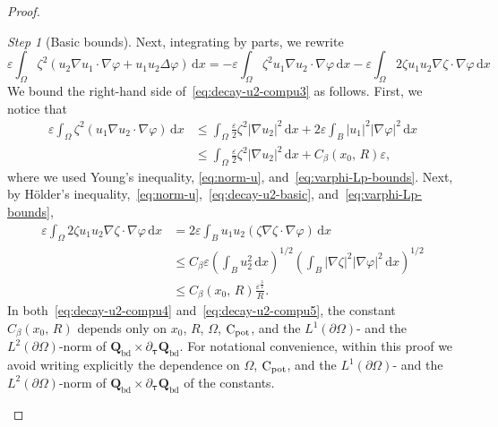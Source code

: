 \documentclass[a4paper, 11pt, twoside, leqno]{article}
\theoremstyle{definition}              %
\theoremstyle{remark}                  %
\newtheorem{step}{Step}
\newcommand{\abs}[1]{\left| #1 \right|}                             %
\renewcommand{\d}{\mathrm{d}}
\newcommand{\Q}{\mathbf{Q}}
\newcommand{\eps}{\varepsilon}
\newcommand{\Cpot}{{\rm C}_{\rm pot}}
\newcommand{\ttau}{{\boldsymbol{\tau}}}
\newcommand{\Qb}{\Q_{\mathrm{bd}}}
\begin{document}
\begin{proof}
\begin{step}[Basic bounds]
    Next, integrating by parts, we rewrite
    \begin{equation}\label{eq:decay-u2-compu3}
        \eps \int_\Omega \zeta^2\left( u_2 \nabla u_1 \cdot \nabla \varphi + u_1 u_2 \Delta \varphi \right) \,{\d}x = 
        - \eps \int_\Omega \zeta^2 u_1 \nabla u_2 \cdot \nabla \varphi \,{\d}x - \eps \int_\Omega 2 \zeta u_1 u_2 \nabla \zeta \cdot \nabla \varphi \,{\d}x
    \end{equation}
    We bound the right-hand side of~\eqref{eq:decay-u2-compu3} as follows. 
    First, we notice that
    \begin{equation}\label{eq:decay-u2-compu4}
    \begin{split}
        \eps \int_\Omega \zeta^2 \left( u_1 \nabla u_2 \cdot \nabla \varphi \right) \,{\d}x &\leq \int_\Omega \frac{\eps}{2} \zeta^2 \abs{\nabla u_2}^2 \,{\d}x + 2 \eps \int_B \abs{u_1}^2 \abs{\nabla \varphi}^2\,{\d}x \\
        &\leq \int_\Omega \frac{\eps}{2} \zeta^2 \abs{\nabla u_2}^2 \,{\d}x + C_{\beta}(x_0,\,R) \eps,
    \end{split}
    \end{equation}
    where we used Young's inequality, \eqref{eq:norm-u}, and~\eqref{eq:varphi-Lp-bounds}. 
    Next, by H\"{o}lder's inequality,~\eqref{eq:norm-u},~\eqref{eq:decay-u2-basic}, 
    and~\eqref{eq:varphi-Lp-bounds}, 
    \begin{equation}\label{eq:decay-u2-compu5}
    \begin{split}
        \eps \int_\Omega 2 \zeta u_1 u_2 \nabla \zeta \cdot \nabla \varphi \,{\d}x 
        &= 2 \eps \int_B u_1 u_2 (\zeta \nabla \zeta \cdot \nabla \varphi)\,{\d}x \\ 
        &\leq C_\beta \eps \left( \int_B u_2^2 \,{\d}x \right)^{1/2}  \left( \int_B \abs{\nabla \zeta}^2 \abs{\nabla \varphi}^2 \,{\d}x \right)^{1/2} \\
        &\leq C_\beta(x_0,\,R) \frac{\eps^\frac{3}{2}}{R}.
    \end{split}
    \end{equation}
    In both~\eqref{eq:decay-u2-compu4} and~\eqref{eq:decay-u2-compu5}, 
    the constant $C_\beta(x_0,\,R)$ depends only on $x_0$, $R$, $\Omega$, $\Cpot$, 
    and the $L^1(\partial\Omega)$- and the $L^2(\partial \Omega)$-norm of 
    $\Qb \times \partial_\ttau \Qb$. 
    For notational convenience, within this proof we avoid writing explicitly 
    the dependence on $\Omega$, $\Cpot$, and the $L^1(\partial\Omega)$- and 
    the $L^2(\partial \Omega)$-norm of $\Qb \times \partial_\ttau \Qb$ of the constants. 
    

\end{step}
\end{proof}
\end{document}
